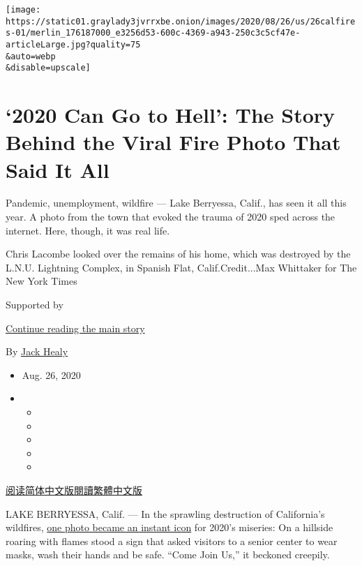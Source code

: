 \texttt{[image: https://static01.graylady3jvrrxbe.onion/images/2020/08/26/us/26calfires-01/merlin\_176187000\_e3256d53-600c-4369-a943-250c3c5cf47e-articleLarge.jpg?quality=75\\\&auto=webp\\\&disable=upscale]}

\hypertarget{2020-can-go-to-hell-the-story-behind-the-viral-fire-photo-that-said-it-all}{%
\section{`2020 Can Go to Hell': The Story Behind the Viral Fire Photo
That Said It
All}\label{2020-can-go-to-hell-the-story-behind-the-viral-fire-photo-that-said-it-all}}

Pandemic, unemployment, wildfire --- Lake Berryessa, Calif., has seen it
all this year. A photo from the town that evoked the trauma of 2020 sped
across the internet. Here, though, it was real life.

Chris Lacombe looked over the remains of his home, which was destroyed
by the L.N.U. Lightning Complex, in Spanish Flat, Calif.Credit...Max
Whittaker for The New York Times

Supported by

\protect\hyperlink{after-sponsor}{Continue reading the main story}

By \href{https://www.nytimes3xbfgragh.onion/by/jack-healy}{Jack Healy}

\begin{itemize}
\item
  Aug. 26, 2020
\item
  \begin{itemize}
  \item
  \item
  \item
  \item
  \item
  \end{itemize}
\end{itemize}

\href{https://cn.nytimes3xbfgragh.onion/usa/20200827/california-wildfires-lake-berryessa/}{阅读简体中文版}\href{https://cn.nytimes3xbfgragh.onion/usa/20200827/california-wildfires-lake-berryessa/zh-hant/}{閱讀繁體中文版}

LAKE BERRYESSA, Calif. --- In the sprawling destruction of California's
wildfires,
\href{https://ktla.com/news/california/thats-2020-photographers-california-wildfire-image-a-sign-of-the-times/}{one
photo became an instant icon} for 2020's miseries: On a hillside roaring
with flames stood a sign that asked visitors to a senior center to wear
masks, wash their hands and be safe. ``Come Join Us,'' it beckoned
creepily.

